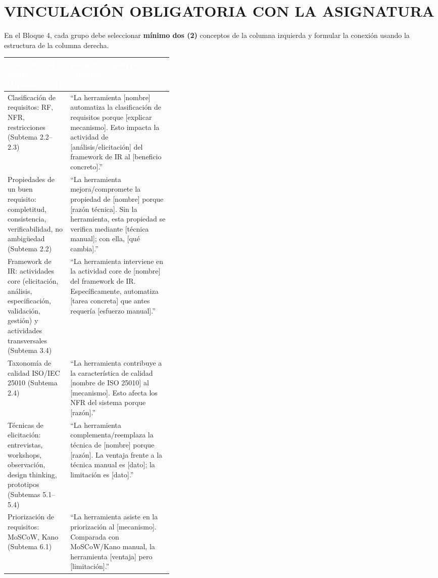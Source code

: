\documentclass[11pt,a4paper]{article}
\newcommand{\hdark}[1]{\cellcolor{darkblue}\textbf{\textcolor{white}{\small #1}}}
\begin{document}
	\section{VINCULACIÓN OBLIGATORIA CON LA ASIGNATURA}\label{sec:vinculacion}
	
	En el Bloque 4, cada grupo debe seleccionar \textbf{mínimo dos (2)} conceptos de la columna izquierda y formular la conexión usando la estructura de la columna derecha.
	
	\vspace{4pt}
	\noindent\begin{tabularx}{\linewidth}{|L{0.38\linewidth}|X|}
		\hline
		\hdark{Concepto del sílabo (Unidades 1--2)} & \hdark{Formato exigido de la conexión}\\
		\hline
		\small Clasificación de requisitos: RF, NFR, restricciones (Subtema 2.2--2.3) & \small ``La herramienta [nombre] automatiza la clasificación de requisitos porque [explicar mecanismo]. Esto impacta la actividad de [análisis/elicitación] del framework de IR al [beneficio concreto].''\\
		\hline
		\small Propiedades de un buen requisito: completitud, consistencia, verificabilidad, no ambigüedad (Subtema 2.2) & \small ``La herramienta mejora/compromete la propiedad de [nombre] porque [razón técnica]. Sin la herramienta, esta propiedad se verifica mediante [técnica manual]; con ella, [qué cambia].''\\
		\hline
		\small Framework de IR: actividades core (elicitación, análisis, especificación, validación, gestión) y actividades transversales (Subtema 3.4) & \small ``La herramienta interviene en la actividad core de [nombre] del framework de IR. Específicamente, automatiza [tarea concreta] que antes requería [esfuerzo manual].''\\
		\hline
		\small Taxonomía de calidad ISO/IEC 25010 (Subtema 2.4) & \small ``La herramienta contribuye a la característica de calidad [nombre de ISO 25010] al [mecanismo]. Esto afecta los NFR del sistema porque [razón].''\\
		\hline
		\small Técnicas de elicitación: entrevistas, workshops, observación, design thinking, prototipos (Subtemas 5.1--5.4) & \small ``La herramienta complementa/reemplaza la técnica de [nombre] porque [razón]. La ventaja frente a la técnica manual es [dato]; la limitación es [dato].''\\
		\hline
		\small Priorización de requisitos: MoSCoW, Kano (Subtema 6.1) & \small ``La herramienta asiste en la priorización al [mecanismo]. Comparada con MoSCoW/Kano manual, la herramienta [ventaja] pero [limitación].''\\

\end{tabularx}
\end{document}
